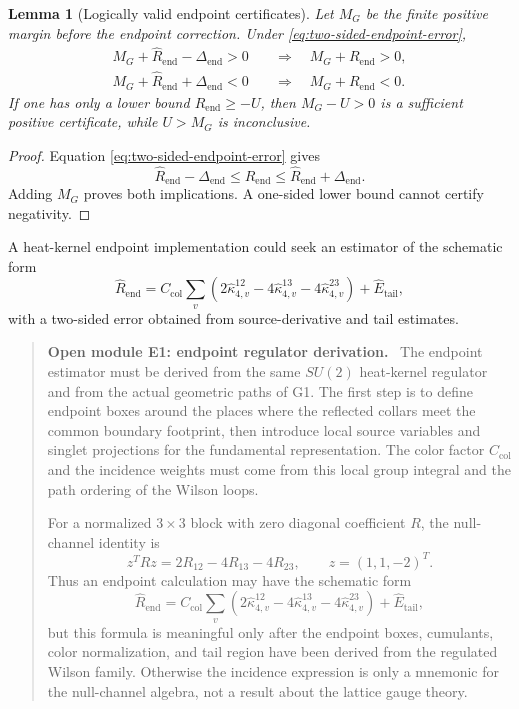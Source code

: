\documentclass[11pt]{article}
\newtheorem{lemma}[theorem]{Lemma}
\newenvironment{openmodule}[1]
{\begin{quote}\color{red!55!black}\textbf{Open module #1.}\ }
{\end{quote}}
\begin{document}
\begin{lemma}[Logically valid endpoint certificates]
\label{lem:endpoint-certificates}
Let $M_G$ be the finite positive margin before the endpoint correction.  Under \eqref{eq:two-sided-endpoint-error},
\begin{align}
  M_G+\widehat R_{\mathrm{end}}-\Delta_{\mathrm{end}}>0
  &\quad\Longrightarrow\quad
  M_G+R_{\mathrm{end}}>0,
  \label{eq:endpoint-positive-certificate}\\
  M_G+\widehat R_{\mathrm{end}}+\Delta_{\mathrm{end}}<0
  &\quad\Longrightarrow\quad
  M_G+R_{\mathrm{end}}<0.
  \label{eq:endpoint-negative-certificate}
\end{align}
If one has only a lower bound $R_{\mathrm{end}}\ge-U$, then $M_G-U>0$ is a sufficient positive certificate, while $U>M_G$ is inconclusive.
\end{lemma}

\begin{proof}
Equation \eqref{eq:two-sided-endpoint-error} gives
\[
  \widehat R_{\mathrm{end}}-\Delta_{\mathrm{end}}
  \le R_{\mathrm{end}}
  \le\widehat R_{\mathrm{end}}+\Delta_{\mathrm{end}}.
\]
Adding $M_G$ proves both implications.  A one-sided lower bound cannot certify negativity.
\end{proof}

A heat-kernel endpoint implementation could seek an estimator of the schematic form
\begin{equation}
  \widehat R_{\mathrm{end}}
  =C_{\mathrm{col}}
  \sum_v\left(
  2\widehat\kappa_{4,v}^{12}
  -4\widehat\kappa_{4,v}^{13}
  -4\widehat\kappa_{4,v}^{23}
  \right)
  +\widehat E_{\mathrm{tail}},
  \label{eq:endpoint-estimator-template}
\end{equation}
with a two-sided error obtained from source-derivative and tail estimates.

\begin{openmodule}{E1: endpoint regulator derivation}
The endpoint estimator must be derived from the same \(SU(2)\) heat-kernel regulator and from the actual geometric paths of G1.  The first step is to define endpoint boxes around the places where the reflected collars meet the common boundary footprint, then introduce local source variables and singlet projections for the fundamental representation.  The color factor \(C_{\mathrm{col}}\) and the incidence weights must come from this local group integral and the path ordering of the Wilson loops.

For a normalized \(3\times3\) block with zero diagonal coefficient \(R\), the null-channel identity is
\[
  z^TRz=2R_{12}-4R_{13}-4R_{23},
  \qquad z=(1,1,-2)^T.
\]
Thus an endpoint calculation may have the schematic form
\[
  \widehat R_{\mathrm{end}}
  =
  C_{\mathrm{col}}\sum_v
  \left(
  2\widehat\kappa^{12}_{4,v}
  -4\widehat\kappa^{13}_{4,v}
  -4\widehat\kappa^{23}_{4,v}
  \right)
  +\widehat E_{\mathrm{tail}},
\]
but this formula is meaningful only after the endpoint boxes, cumulants, color normalization, and tail region have been derived from the regulated Wilson family.  Otherwise the incidence expression is only a mnemonic for the null-channel algebra, not a result about the lattice gauge theory.
\end{openmodule}
\end{document}
